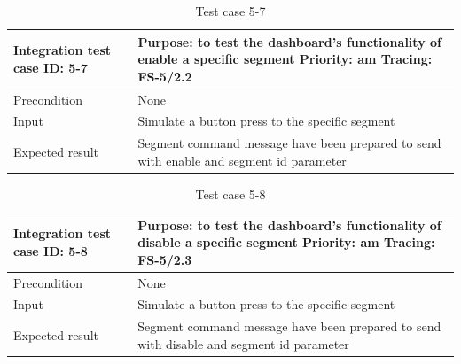 \begin{table}[H]
	\caption{Test case 5-7}
	\label{table:TCase-FS5-7}
	\begin{center}
		\renewcommand{\arraystretch}{1.8}
		\begin{tabu} 
			to 0.9 \textwidth
			{  X[0.3, l] X[l] }
			\toprule
			Integration test case ID: 5-7 & Purpose: to test the dashboard's functionality of enable a specific segment   \newline Priority: am \newline Tracing: FS-5/2.2 \\ \midrule
			Precondition                  & None                                                                                                                           \\
			Input                         & Simulate a button press to the specific segment                                                                                \\
			Expected result               & Segment command message have been prepared to send with enable and segment id parameter                                        \\ \bottomrule
		\end{tabu}
	\end{center}
\end{table}

\begin{table}[H]
	\caption{Test case 5-8}
	\label{table:TCase-FS5-8}
	\begin{center}
		\renewcommand{\arraystretch}{1.8}
		\begin{tabu} 
			to 0.9 \textwidth
			{  X[0.3, l] X[l] }
			\toprule
			Integration test case ID: 5-8 & Purpose: to test the dashboard's functionality of disable a specific segment   \newline Priority: am \newline Tracing: FS-5/2.3 \\ \midrule
			Precondition                  & None                                                                                                                            \\
			Input                         & Simulate a button press to the specific segment                                                                                 \\
			Expected result               & Segment command message have been prepared to send with disable and segment id parameter                                        \\ \bottomrule
		\end{tabu}
	\end{center}
\end{table}

